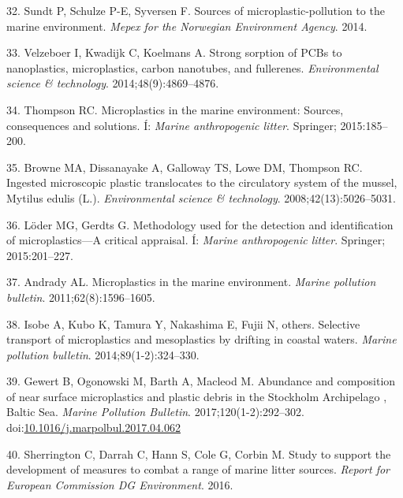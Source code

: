 \documentclass[icelandic,]{book}
\begin{document}
\leavevmode\hypertarget{ref-sundt2014sources}{}%
32. Sundt P, Schulze P-E, Syversen F. Sources of microplastic-pollution to the marine environment. \emph{Mepex for the Norwegian Environment Agency}. 2014.

\leavevmode\hypertarget{ref-velzeboer2014strong}{}%
33. Velzeboer I, Kwadijk C, Koelmans A. Strong sorption of PCBs to nanoplastics, microplastics, carbon nanotubes, and fullerenes. \emph{Environmental science \& technology}. 2014;48(9):4869--4876.

\leavevmode\hypertarget{ref-thompson2015microplastics}{}%
34. Thompson RC. Microplastics in the marine environment: Sources, consequences and solutions. Í: \emph{Marine anthropogenic litter}. Springer; 2015:185--200.

\leavevmode\hypertarget{ref-browne2008ingested}{}%
35. Browne MA, Dissanayake A, Galloway TS, Lowe DM, Thompson RC. Ingested microscopic plastic translocates to the circulatory system of the mussel, Mytilus edulis (L.). \emph{Environmental science \& technology}. 2008;42(13):5026--5031.

\leavevmode\hypertarget{ref-loder2015methodology}{}%
36. Löder MG, Gerdts G. Methodology used for the detection and identification of microplastics---A critical appraisal. Í: \emph{Marine anthropogenic litter}. Springer; 2015:201--227.

\leavevmode\hypertarget{ref-andrady2011microplastics}{}%
37. Andrady AL. Microplastics in the marine environment. \emph{Marine pollution bulletin}. 2011;62(8):1596--1605.

\leavevmode\hypertarget{ref-isobe2014selective}{}%
38. Isobe A, Kubo K, Tamura Y, Nakashima E, Fujii N, others. Selective transport of microplastics and mesoplastics by drifting in coastal waters. \emph{Marine pollution bulletin}. 2014;89(1-2):324--330.

\leavevmode\hypertarget{ref-Gewert2017}{}%
39. Gewert B, Ogonowski M, Barth A, Macleod M. Abundance and composition of near surface microplastics and plastic debris in the Stockholm Archipelago , Baltic Sea. \emph{Marine Pollution Bulletin}. 2017;120(1-2):292--302. doi:\href{https://doi.org/10.1016/j.marpolbul.2017.04.062}{10.1016/j.marpolbul.2017.04.062}

\leavevmode\hypertarget{ref-sherrington2016study}{}%
40. Sherrington C, Darrah C, Hann S, Cole G, Corbin M. Study to support the development of measures to combat a range of marine litter sources. \emph{Report for European Commission DG Environment}. 2016.
\end{document}

